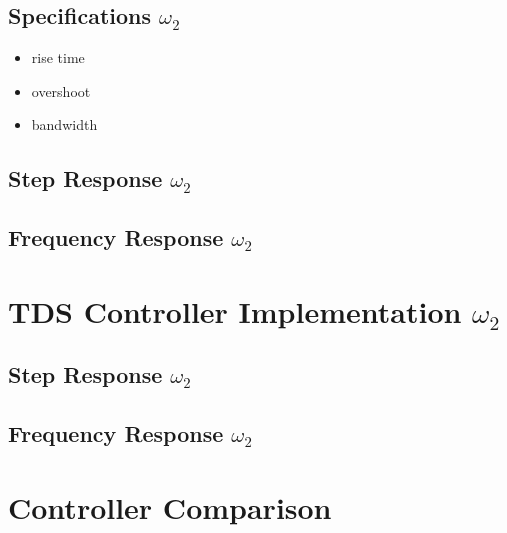 \documentclass[11pt,titlepage]{article}
\begin{document}
	\subsection{Specifications $\omega_2$}
		\begin{itemize}
			\item rise time
			\item overshoot
			\item bandwidth
		\end{itemize}

	\subsection{Step Response $\omega_2$}

	\subsection{Frequency Response $\omega_2$}

\section{TDS Controller Implementation $\omega_2$}

	\subsection{Step Response $\omega_2$}

	\subsection{Frequency Response $\omega_2$}

\section{Controller Comparison}
\end{document}
